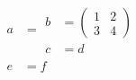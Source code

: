 \begin{align}
a & = \begin{aligned}
b & = \begin{pmatrix} 1 & 2 \\ 3 & 4 \end{pmatrix} \\
c & = d
\end{aligned} \\
e & = f
\end{align}
